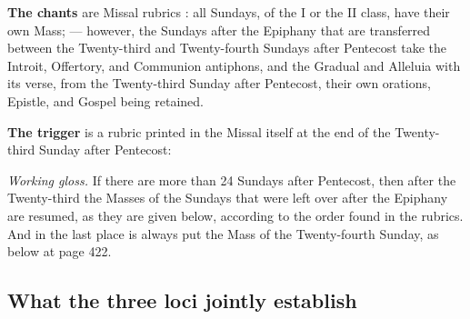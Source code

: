 \textbf{The chants} are Missal rubrics : all Sundays, of the I or the II class, have
their own Mass;  — however, the Sundays after the Epiphany
that are transferred between the Twenty-third and Twenty-fourth Sundays after Pentecost take
the Introit, Offertory, and Communion antiphons, and the Gradual and Alleluia with its verse,
from the Twenty-third Sunday after Pentecost, their own orations, Epistle, and Gospel being
retained.

\textbf{The trigger} is a rubric printed in the Missal itself at the end of the Twenty-third
Sunday after Pentecost:

\begin{studyframe}
\medskip

\textit{Working gloss.} If there are more than 24 Sundays after Pentecost, then after the
Twenty-third the Masses of the Sundays that were left over after the Epiphany are resumed, as
they are given below, according to the order found in the rubrics. And in the last place is
always put the Mass of the Twenty-fourth Sunday, as below at page 422.
\end{studyframe}

\subsection{What the three loci jointly establish}

